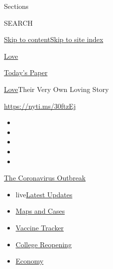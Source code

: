 Sections

SEARCH

\protect\hyperlink{site-content}{Skip to
content}\protect\hyperlink{site-index}{Skip to site index}

\href{https://www.nytimes.com/section/fashion/weddings}{Love}

\href{https://myaccount.nytimes.com/auth/login?response_type=cookie\&client_id=vi}{}

\href{https://www.nytimes.com/section/todayspaper}{Today's Paper}

\href{/section/fashion/weddings}{Love}\textbar{}Their Very Own Loving
Story

\url{https://nyti.ms/30ftzEj}

\begin{itemize}
\item
\item
\item
\item
\item
\end{itemize}

\href{https://www.nytimes.com/news-event/coronavirus?action=click\&pgtype=Article\&state=default\&region=TOP_BANNER\&context=storylines_menu}{The
Coronavirus Outbreak}

\begin{itemize}
\tightlist
\item
  live\href{https://www.nytimes.com/2020/08/04/world/coronavirus-cases.html?action=click\&pgtype=Article\&state=default\&region=TOP_BANNER\&context=storylines_menu}{Latest
  Updates}
\item
  \href{https://www.nytimes.com/interactive/2020/us/coronavirus-us-cases.html?action=click\&pgtype=Article\&state=default\&region=TOP_BANNER\&context=storylines_menu}{Maps
  and Cases}
\item
  \href{https://www.nytimes.com/interactive/2020/science/coronavirus-vaccine-tracker.html?action=click\&pgtype=Article\&state=default\&region=TOP_BANNER\&context=storylines_menu}{Vaccine
  Tracker}
\item
  \href{https://www.nytimes.com/2020/08/02/us/covid-college-reopening.html?action=click\&pgtype=Article\&state=default\&region=TOP_BANNER\&context=storylines_menu}{College
  Reopening}
\item
  \href{https://www.nytimes.com/live/2020/08/04/business/stock-market-today-coronavirus?action=click\&pgtype=Article\&state=default\&region=TOP_BANNER\&context=storylines_menu}{Economy}
\end{itemize}

